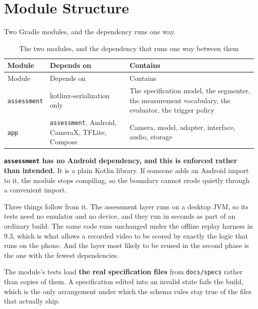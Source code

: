 \section{Module Structure}
\label{sec:5.4}

Two Gradle modules, and the dependency runs one way.

{\small
\setlength{\LTpre}{6pt}\setlength{\LTpost}{8pt}
\begin{longtable}{>{\raggedright\arraybackslash}p{}>{\raggedright\arraybackslash}p{}>{\raggedright\arraybackslash}p{}}
\caption{The two modules, and the dependency that runs one way between them}\\
\toprule
Module & Depends on & Contains \\
\midrule
\endfirsthead
\toprule
Module & Depends on & Contains \\
\midrule
\endhead
\bottomrule
\endfoot
\bottomrule
\endlastfoot
\texttt{assessment} & kotlinx-serialization only & The specification model, the segmenter, the measurement vocabulary, the evaluator, the trigger policy \\
\texttt{app} & \texttt{assessment}, Android, CameraX, TFLite, Compose & Camera, model, adapter, interface, audio, storage \\
\end{longtable}
}

\textbf{\texttt{assessment} has no Android dependency, and this is enforced rather than intended.} It is a plain Kotlin library. If someone adds an Android import to it, the module stops compiling, so the boundary cannot erode quietly through a convenient import.

Three things follow from it. The assessment layer runs on a desktop JVM, so its tests need no emulator and no device, and they run in seconds as part of an ordinary build. The same code runs unchanged under the offline replay harness in 9.3, which is what allows a recorded video to be scored by exactly the logic that runs on the phone. And the layer most likely to be reused in the second phase is the one with the fewest dependencies.

The module's tests load \textbf{the real specification files} from \texttt{docs/\allowbreak{}specs} rather than copies of them. A specification edited into an invalid state fails the build, which is the only arrangement under which the schema rules stay true of the files that actually ship.

